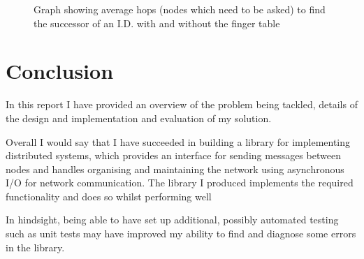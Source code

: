 \documentclass{article}
\begin{document}
\begin{figure}
\begin{center}
\end{center}
\caption{Graph showing average hops (nodes which need to be asked) to find the successor of an I.D. with and without the finger table}
\label{fig:fingerperf}
\end{figure}




\section{Conclusion}

In this report I have provided an overview of the problem being tackled, details of the design and implementation and evaluation of my solution.

Overall I would say that I have succeeded in building a library for implementing distributed systems, which provides an interface for sending messages between nodes and handles organising and maintaining the network using asynchronous I/O for network communication. The library I produced implements the required functionality and does so whilst performing well

In hindsight, being able to have set up additional, possibly automated testing such as unit tests may have improved my ability to find and diagnose some errors in the library.
\end{document}

